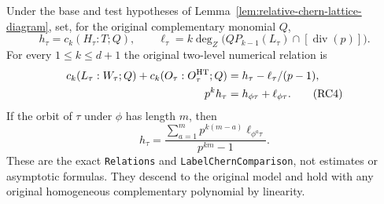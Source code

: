 \begin{theorem}
\label{thm:relative-chern-two-identities}
Under the base and test hypotheses of
Lemma~\ref{lem:relative-chern-lattice-diagram}, set, for the original
complementary monomial \(Q\),
\[
 h_\tau=c_k(H_\tau:T;Q),\qquad
 \ell_\tau=k\deg_Z\bigl(QP_{k-1}(L_\tau)
                              \cap[\operatorname{div}(p)]\bigr).
\]
For every \(1\le k\le d+1\) the original two-level numerical
relation is
\[
\begin{split}
 c_k(L_\tau:W_\tau;Q)+c_k(O_\tau:O_\tau^{\rm HT};Q)
     &=h_\tau-\ell_\tau/(p-1),\\
 p^kh_\tau&=h_{\phi\tau}+\ell_{\phi\tau}.                 \tag{RC4}
\end{split}
\]
If the orbit of \(\tau\) under \(\phi\) has length \(m\), then
\[
 h_\tau=\frac{\sum_{a=1}^{m}p^{k(m-a)}
                                  \ell_{\phi^a\tau}}{p^{km}-1}.
                                                               \tag{RC5}
\]
These are the exact \texttt{Relations} and
\texttt{LabelChernComparison}, not estimates or asymptotic
formulas. They descend to the original model and hold with
any original homogeneous complementary polynomial by linearity.
\end{theorem}
